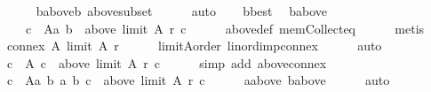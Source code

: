 \begin{isabellebody}
\ \ \ \ \isamarkupfalse%
\ b{\isacharunderscore}{\kern0pt}above{\isacharunderscore}{\kern0pt}b\ above{\isacharunderscore}{\kern0pt}subset\isanewline
\ \ \ \ \isamarkupfalse%
\ auto\isanewline
\ \ \isamarkupfalse%
\ b{\isacharunderscore}{\kern0pt}best\ \isamarkupfalse%
\ b{\isacharunderscore}{\kern0pt}above{\isacharcolon}{\kern0pt}\isanewline
\ \ \ \ {\isachardoublequoteopen}{\isasymforall}c\ {\isasymin}\ A{\isacharminus}{\kern0pt}{\isacharbraceleft}{\kern0pt}a{\isacharbraceright}{\kern0pt}{\isachardot}{\kern0pt}\ b\ {\isasymin}\ above\ {\isacharparenleft}{\kern0pt}limit\ A\ r{\isacharparenright}{\kern0pt}\ c{\isachardoublequoteclose}\isanewline
\ \ \ \ \isamarkupfalse%
\ above{\isacharunderscore}{\kern0pt}def\ mem{\isacharunderscore}{\kern0pt}Collect{\isacharunderscore}{\kern0pt}eq\isanewline
\ \ \ \ \isamarkupfalse%
\ metis\isanewline
\ \ \isamarkupfalse%
\ {\isachardoublequoteopen}connex\ A\ {\isacharparenleft}{\kern0pt}limit\ A\ r{\isacharparenright}{\kern0pt}{\isachardoublequoteclose}\isanewline
\ \ \ \ \isamarkupfalse%
\ limitA{\isacharunderscore}{\kern0pt}order\ lin{\isacharunderscore}{\kern0pt}ord{\isacharunderscore}{\kern0pt}imp{\isacharunderscore}{\kern0pt}connex\isanewline
\ \ \ \ \isamarkupfalse%
\ auto\isanewline
\ \ \isamarkupfalse%
\ {\isachardoublequoteopen}{\isasymforall}c\ {\isasymin}\ A{\isachardot}{\kern0pt}\ c\ {\isasymin}\ above\ {\isacharparenleft}{\kern0pt}limit\ A\ r{\isacharparenright}{\kern0pt}\ c{\isachardoublequoteclose}\isanewline
\ \ \ \ \isamarkupfalse%
\ {\isacharparenleft}{\kern0pt}simp\ add{\isacharcolon}{\kern0pt}\ above{\isacharunderscore}{\kern0pt}connex{\isacharparenright}{\kern0pt}\isanewline
\ \ \isamarkupfalse%
\ {\isachardoublequoteopen}{\isasymforall}c\ {\isasymin}\ A{\isacharminus}{\kern0pt}{\isacharbraceleft}{\kern0pt}a{\isacharcomma}{\kern0pt}\ b{\isacharbraceright}{\kern0pt}{\isachardot}{\kern0pt}\ {\isacharbraceleft}{\kern0pt}a{\isacharcomma}{\kern0pt}\ b{\isacharcomma}{\kern0pt}\ c{\isacharbraceright}{\kern0pt}\ {\isasymsubseteq}\ above\ {\isacharparenleft}{\kern0pt}limit\ A\ r{\isacharparenright}{\kern0pt}\ c{\isachardoublequoteclose}\isanewline
\ \ \ \ \isamarkupfalse%
\ a{\isacharunderscore}{\kern0pt}above\ b{\isacharunderscore}{\kern0pt}above\isanewline
\ \ \ \ \isamarkupfalse%
\ auto\isanewline
\ \ \isamarkupfalse%
\ \isamarkupfalse%

\end{isabellebody}
